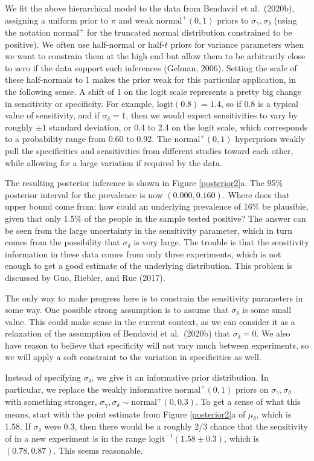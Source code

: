 \documentclass[11pt]{article}
\begin{document}
We fit the above hierarchical model to the data from Bendavid et al.\
(2020b), assigning a uniform prior to $\pi$ and weak
$\mbox{normal}^+(0,1)$ priors to $\sigma_{\gamma},\sigma_{\delta}$
(using the notation $\mbox{normal}^+$ for the truncated normal
distribution constrained to be positive).  We often use half-normal or
half-$t$ priors for variance parameters when we want to constrain them
at the high end but allow them to be arbitrarily close to zero if the
data support such inferences (Gelman, 2006).  Setting the scale of
these half-normals to 1 makes the prior weak for this particular
application, in the following sense. A shift of 1 on the logit scale
represents a pretty big change in sensitivity or specificity.  For
example, $\mbox{logit}(0.8)=1.4$, so if 0.8 is a typical value of
sensitivity, and if $\sigma_{\delta}=1$, then we would expect
sensitivities to vary by roughly $\pm 1$ standard
deviation, or 0.4 to 2.4 on the logit scale,
which corresponds to a probability range from 0.60 to 0.92.  The
$\mbox{normal}^+(0,1)$ hyperpriors weakly pull the specificities and
sensitivities from different studies toward each other, while allowing
for a large variation if required by the data.

The resulting posterior inference is shown in Figure
\ref{posterior2}a.  The 95\% posterior interval for the prevalence is
now $(0.000, 0.160)$.  Where does that upper bound come from: how could
an underlying prevalence of 16\% be plausible, given that only 1.5\% of
the people in the sample tested positive?  The answer can be seen from
the large uncertainty in the sensitivity parameter, which in turn
comes from the possibility that $\sigma_{\delta}$ is very large.  The
trouble is that the sensitivity information in these data comes from
only three experiments, which is not enough to get a good estimate of
the underlying distribution.  This problem is discussed by Guo,
Riebler, and Rue (2017).

The only way to make progress here is to constrain the sensitivity
parameters in some way.  One possible strong assumption is to assume
that $\sigma_{\delta}$ is some small value.  This could make sense in
the current context, as we can consider it as a relaxation of the
assumption of Bendavid et al.\ (2020b) that $\sigma_{\delta} = 0$.  We
also have reason to believe that specificity will not vary much
between experiments, so we will apply a soft constraint to the
variation in specificities as well.

Instead of specifying $\sigma_{\delta}$, we give it an informative
prior distribution.  In particular, we replace the weakly informative
$\mbox{normal}^+(0, 1)$ priors on $\sigma_{\gamma},\sigma_{\delta}$
with something stronger,
$\sigma_{\gamma}, \sigma_{\delta}\sim\mbox{normal}^+(0, 0.3)$.  To get
a sense of what this means, start with the point estimate from Figure
\ref{posterior2}a of $\mu_{\delta}$, which is 1.58. If $\sigma_{\delta}$ were 0.3, then there would be a roughly 2/3 chance that the sensitivity of
in a new experiment is in the range
$\mbox{logit}^{-1}(1.58 \pm 0.3)$, which is $(0.78, 0.87)$. This seems reasonable.
\end{document}
